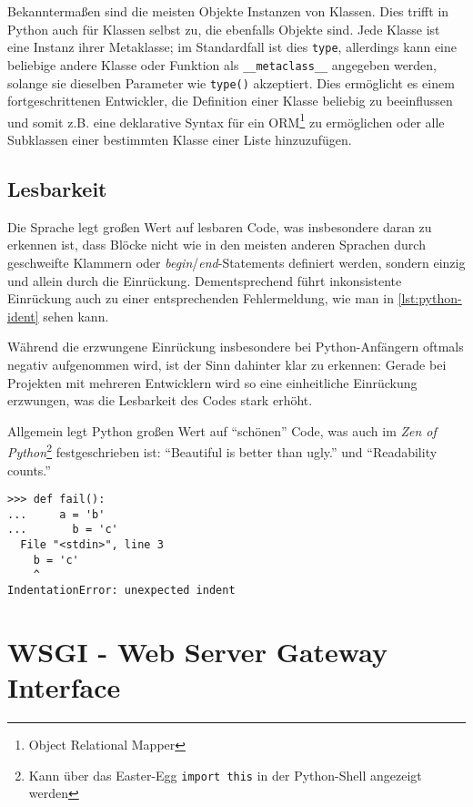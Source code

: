 Bekanntermaßen sind die meisten Objekte Instanzen von Klassen. Dies trifft in Python auch für
Klassen selbst zu, die ebenfalls Objekte sind. Jede Klasse ist eine Instanz ihrer Metaklasse; im
Standardfall ist dies \lstinline{type}, allerdings kann eine beliebige andere Klasse oder Funktion
als \lstinline{__metaclass__} angegeben werden, solange sie dieselben Parameter wie
\lstinline{type()} akzeptiert. Dies ermöglicht es einem fortgeschrittenen Entwickler, die Definition
einer Klasse beliebig zu beeinflussen und somit z.B. eine deklarative Syntax für ein
ORM\footnote{Object Relational Mapper} zu ermöglichen oder alle Subklassen einer bestimmten Klasse
einer Liste hinzuzufügen.



\subsection{Lesbarkeit}

Die Sprache legt großen Wert auf lesbaren Code, was insbesondere daran zu erkennen ist, dass Blöcke
nicht wie in den meisten anderen Sprachen durch geschweifte Klammern oder
\emph{begin}/\emph{end}-Statements definiert werden, sondern einzig und allein durch die Einrückung.
Dementsprechend führt inkonsistente Einrückung auch zu einer entsprechenden Fehlermeldung, wie man
in \autoref{lst:python-ident} sehen kann.

Während die erzwungene Einrückung insbesondere bei Python-Anfängern oftmals negativ aufgenommen
wird, ist der Sinn dahinter klar zu erkennen: Gerade bei Projekten mit mehreren Entwicklern wird so
eine einheitliche Einrückung erzwungen, was die Lesbarkeit des Codes stark erhöht.

Allgemein legt Python großen Wert auf \enquote{schönen} Code, was auch im \emph{Zen of
Python}\footnote{Kann über das Easter-Egg \lstinline{import this} in der Python-Shell angezeigt
werden}
festgeschrieben ist:
\enquote{Beautiful is better than ugly.} und \enquote{Readability counts.} \citep{zenofpython}

\begin{lstlisting}[caption=Fehlerhafte Einrückung,label=lst:python-ident]
>>> def fail():
...     a = 'b'
...       b = 'c'
  File "<stdin>", line 3
    b = 'c'
    ^
IndentationError: unexpected indent
\end{lstlisting}




\section{WSGI - Web Server Gateway Interface}

